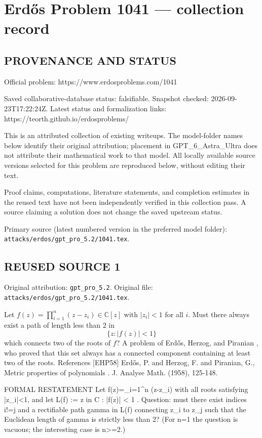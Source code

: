 \section*{Erd\H{o}s Problem 1041 --- collection record}

\subsection*{PROVENANCE AND STATUS}
Official problem: https://www.erdosproblems.com/1041

Saved collaborative-database status: falsifiable.
Snapshot checked: 2026-09-23T17:22:24Z.
Latest status and formalization links: https://teorth.github.io/erdosproblems/

This is an attributed collection of existing writeups. The model-folder names below identify their original attribution; placement in GPT\_6\_Astra\_Ultra does not attribute their mathematical work to that model. All locally available source versions selected for this problem are reproduced below, without editing their text.

Proof claims, computations, literature statements, and completion estimates in the reused text have not been independently verified in this collection pass. A source claiming a solution does not change the saved upstream status.

Primary source (latest numbered version in the preferred model folder): \texttt{attacks/erdos/gpt\_pro\_5.2/1041.tex}.

\subsection*{REUSED SOURCE 1}
Original attribution: \texttt{gpt\_pro\_5.2}.
Original file: \texttt{attacks/erdos/gpt\_pro\_5.2/1041.tex}.


Let $f(z)=\prod_{i=1}^n(z-z_i)\in \mathbb{C}[z]$ with $\lvert z_i\rvert < 1$ for all $i$. Must there always exist a path of length less than $2$ in\[\{z: \lvert f(z)\rvert < 1\}\]which connects two of the roots of $f$? A problem of Erd\H{o}s, Herzog, and Piranian \cite{EHP58}, who proved that this set always has a connected component containing at least two of the roots. References [EHP58] Erd\H{o}s, P. and Herzog, F. and Piranian, G., Metric properties of polynomials . J. Analyse Math. (1958), 125-148.



FORMAL RESTATEMENT
Let f(z)=\prod_{i=1}^n (z-z_i) with all roots satisfying |z_i|<1, and let
  L(f) := { z in C : |f(z)| < 1 }.
Question: must there exist indices i!=j and a rectifiable path gamma in L(f) connecting z_i to z_j such that the Euclidean length of gamma is strictly less than 2?
(For n=1 the question is vacuous; the interesting case is n>=2.)

